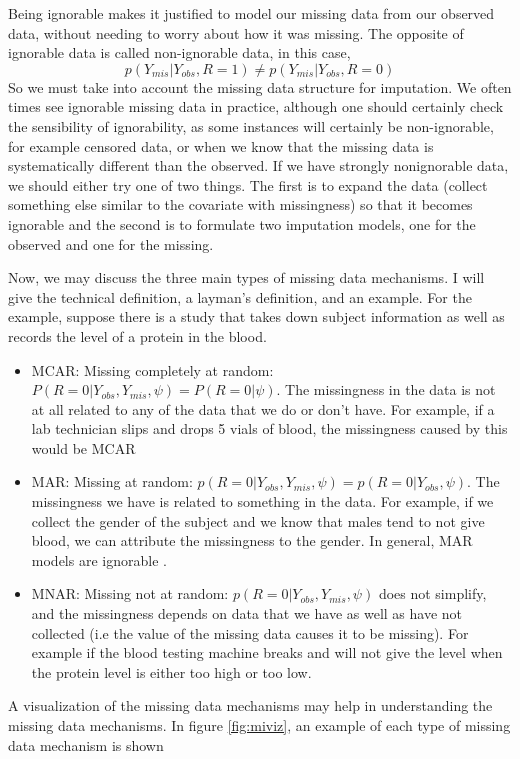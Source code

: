 Being ignorable makes it justified to model our missing data from our observed data, without needing to worry about how it was missing.
The opposite of ignorable data is called non-ignorable data, in this case, 
$$p(Y_{mis}|Y_{obs},R=1)\neq p(Y_{mis}|Y_{obs},R=0)$$
So we must take into account the missing data structure for imputation.
We often times see ignorable missing data in practice, although one should certainly check the sensibility of ignorability, as some instances will certainly be non-ignorable, for example censored data, or when we know that the missing data is systematically different than the observed. If we have strongly nonignorable data, we should either try one of two things. The first is to expand the data (collect something else similar to the covariate with missingness) so that it becomes ignorable and the second is to formulate two imputation models, one for the observed and one for the missing.

Now, we may discuss the three main types of missing data mechanisms. I will give the technical definition, a layman's definition, and an example. For the example, suppose there is a study that takes down subject information as well as records the level of a protein in the blood.
\begin{itemize}
\item MCAR: Missing completely at random:  $P(R=0|Y_{obs},Y_{mis},\psi)=P(R=0|\psi)$. The missingness in the data is not at all related to any of the data that we do or don't have. For example, if a lab technician slips and drops 5 vials of blood, the missingness caused by this would be MCAR
\item MAR: Missing at random: $p(R=0|Y_{obs},Y_{mis},\psi)= p(R=0|Y_{obs},\psi)$. The missingness we have is related to something in the data. For example, if we collect the gender of the subject and we know that males tend to not give blood, we can attribute the missingness to the gender. In general, MAR models are ignorable \cite{VanBuuren2012}.
\item MNAR: Missing not at random: $p(R=0|Y_{obs},Y_{mis},\psi)$ does not simplify, and the missingness depends on data that we have as well as have not collected (i.e the value of the missing data causes it to be missing). For example if the blood testing machine breaks and will not give the level when the protein level is either too high or too low.
\end{itemize}

A visualization of the missing data mechanisms may help in understanding the missing data mechanisms. In figure \ref{fig:miviz}, an example of each type of missing data mechanism is shown


